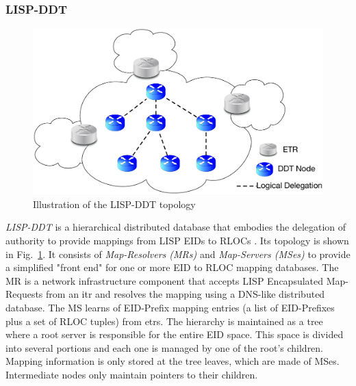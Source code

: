 \subsubsection{LISP-DDT}
\label{sec:lispddt}
\begin{figure}[!t]
	\centering
	\includegraphics[width=\textwidth]{Chapter2/Pics/LISP_DDT.eps}
	\caption{Illustration of the LISP-DDT topology}
	\label{LISP_DDT}
\end{figure}
\emph{LISP-DDT} is a hierarchical distributed database that embodies the delegation of authority to provide mappings from LISP EIDs to RLOCs . Its topology is shown in Fig.~\ref{LISP_DDT}. It consists of \emph{Map-Resolvers (MRs)} and \emph{Map-Servers (MSes)} to provide a simplified "front end" for one or more EID to RLOC mapping databases. The MR is a network infrastructure component that accepts LISP Encapsulated Map-Requests from an \acrshort{itr} and resolves the mapping using a DNS-like distributed database. The MS learns of EID-Prefix mapping entries (a list of EID-Prefixes plus a set of RLOC tuples) from \acrshort{etr}s. The hierarchy is maintained as a tree where a root server is responsible for the entire EID space. This space is divided into several portions and each one is managed by one of the root’s children.
Mapping information is only stored at the tree leaves, which are made of MSes. Intermediate nodes only maintain pointers to their children.

